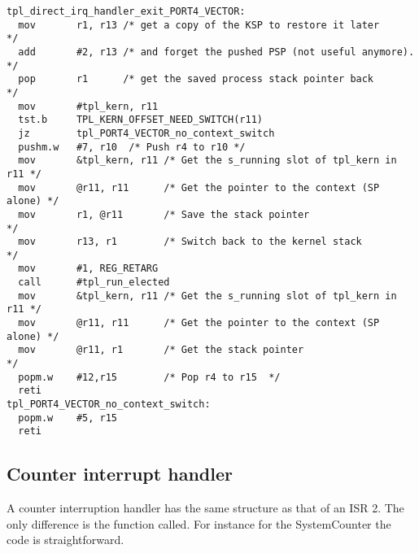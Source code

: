 \documentclass[11pt, oneside]{article}   	%
\begin{document}
\begin{lstlisting}[basicstyle=\footnotesize\ttfamily]
tpl_direct_irq_handler_exit_PORT4_VECTOR:
  mov       r1, r13 /* get a copy of the KSP to restore it later        */
  add       #2, r13 /* and forget the pushed PSP (not useful anymore).  */
  pop       r1      /* get the saved process stack pointer back         */
  mov       #tpl_kern, r11
  tst.b     TPL_KERN_OFFSET_NEED_SWITCH(r11)
  jz        tpl_PORT4_VECTOR_no_context_switch
  pushm.w   #7, r10  /* Push r4 to r10 */
  mov       &tpl_kern, r11 /* Get the s_running slot of tpl_kern in r11 */
  mov       @r11, r11      /* Get the pointer to the context (SP alone) */
  mov       r1, @r11       /* Save the stack pointer                    */
  mov       r13, r1        /* Switch back to the kernel stack           */
  mov       #1, REG_RETARG
  call      #tpl_run_elected
  mov       &tpl_kern, r11 /* Get the s_running slot of tpl_kern in r11 */
  mov       @r11, r11      /* Get the pointer to the context (SP alone) */
  mov       @r11, r1       /* Get the stack pointer                     */
  popm.w    #12,r15        /* Pop r4 to r15  */
  reti
tpl_PORT4_VECTOR_no_context_switch:
  popm.w    #5, r15
  reti
\end{lstlisting}

\subsection{Counter interrupt handler}

A counter interruption handler has the same structure as that of an ISR 2. The only difference is the function called. For instance for the SystemCounter the code is straightforward.
\end{document}
